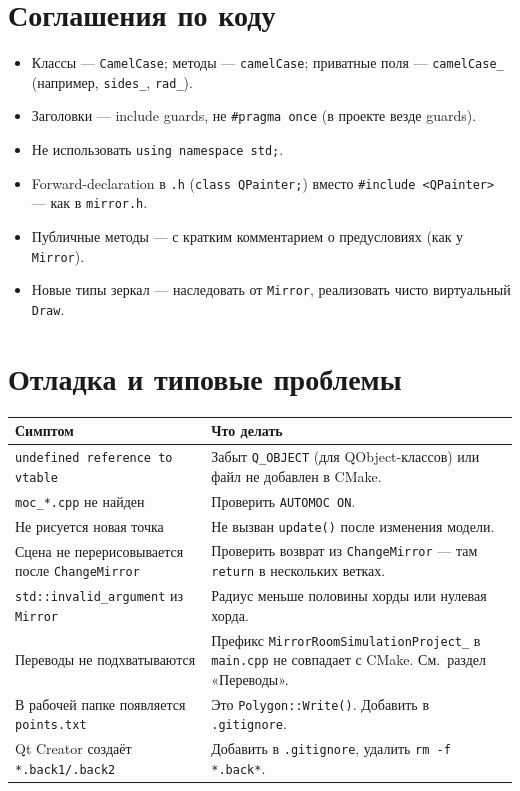 \documentclass[a4paper,11pt]{article}
\newcommand{\file}[1]{\texttt{#1}}
\newcommand{\code}[1]{\texttt{#1}}
\begin{document}
\section{Соглашения по коду}

\begin{itemize}[leftmargin=*]
    \item Классы — \code{CamelCase}; методы — \code{camelCase};
          приватные поля — \code{camelCase\_} (например, \code{sides\_},
          \code{rad\_}).
    \item Заголовки — include guards, не \code{\#pragma once}
          (в проекте везде guards).
    \item Не использовать \code{using namespace std;}.
    \item Forward-declaration в \file{.h} (\code{class QPainter;})
          вместо \code{\#include <QPainter>} — как в \file{mirror.h}.
    \item Публичные методы — с кратким комментарием о
          предусловиях (как у \code{Mirror}).
    \item Новые типы зеркал — наследовать от \code{Mirror}, реализовать
          чисто виртуальный \code{Draw}.
\end{itemize}

\section{Отладка и типовые проблемы}

\begin{longtable}{@{}p{6.3cm}p{8.2cm}@{}}
\toprule
\textbf{Симптом} & \textbf{Что делать} \\ \midrule
\endhead
\code{undefined reference to vtable} &
Забыт \code{Q\_OBJECT} (для QObject-классов) или файл не добавлен
в CMake. \\
\addlinespace
\code{moc\_*.cpp} не найден &
Проверить \code{AUTOMOC ON}. \\
\addlinespace
Не рисуется новая точка &
Не вызван \code{update()} после изменения модели. \\
\addlinespace
Сцена не перерисовывается после \code{ChangeMirror} &
Проверить возврат из \code{ChangeMirror} — там \code{return} в нескольких
ветках. \\
\addlinespace
\code{std::invalid\_argument} из \code{Mirror} &
Радиус меньше половины хорды или нулевая хорда. \\
\addlinespace
Переводы не подхватываются &
Префикс \code{MirrorRoomSimulationProject\_} в \file{main.cpp}
не совпадает с CMake. См.~раздел «Переводы». \\
\addlinespace
В рабочей папке появляется \file{points.txt} &
Это \code{Polygon::Write()}. Добавить в \code{.gitignore}. \\
\addlinespace
Qt Creator создаёт \file{*.back1/.back2} &
Добавить в \code{.gitignore}, удалить \code{rm -f *.back*}. \\
\bottomrule
\end{longtable}
\end{document}
